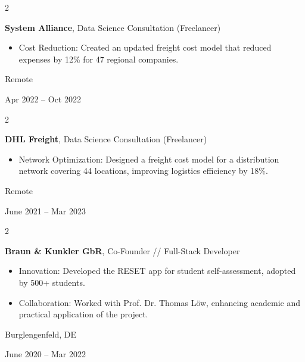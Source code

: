 \documentclass[10pt, a4paper]{article}
\newenvironment{highlights}{
    \begin{itemize}[
        topsep=0.10 cm,
        parsep=0.10 cm,
        partopsep=0pt,
        itemsep=0pt,
        leftmargin=0.4 cm + 10pt
    ]
}{
    \end{itemize}
} %
\newenvironment{twocolentry}[2][]{
    \onecolentry
    \def\secondColumn{#2}
    \setcolumnwidth{\fill, 4.5 cm}
    \begin{paracol}{2}
}{
    \switchcolumn \raggedleft \secondColumn
    \end{paracol}
    \endonecolentry
} %
\begin{document}
        \vspace{0.2 cm}

        \begin{twocolentry}{
            Remote

        Apr 2022 – Oct 2022
        }
            \textbf{System Alliance}, Data Science Consultation (Freelancer)
            \begin{highlights}
                \item Cost Reduction: Created an updated freight cost model that reduced expenses by 12\% for 47 regional companies.
            \end{highlights}
        \end{twocolentry}


        \vspace{0.2 cm}

        \begin{twocolentry}{
            Remote

        June 2021 – Mar 2023
        }
            \textbf{DHL Freight}, Data Science Consultation (Freelancer)
            \begin{highlights}
                \item Network Optimization: Designed a freight cost model for a distribution network covering 44 locations, improving logistics efficiency by 18\%.
            \end{highlights}
        \end{twocolentry}


        \vspace{0.2 cm}

        \begin{twocolentry}{
            Burglengenfeld, DE

        June 2020 – Mar 2022
        }
            \textbf{Braun \& Kunkler GbR}, Co-Founder // Full-Stack Developer
            \begin{highlights}
                \item Innovation: Developed the RESET app for student self-assessment, adopted by 500+ students.
                \item Collaboration: Worked with Prof. Dr. Thomas Löw, enhancing academic and practical application of the project.
            \end{highlights}
        \end{twocolentry}


        \vspace{0.2 cm}
\end{document}
